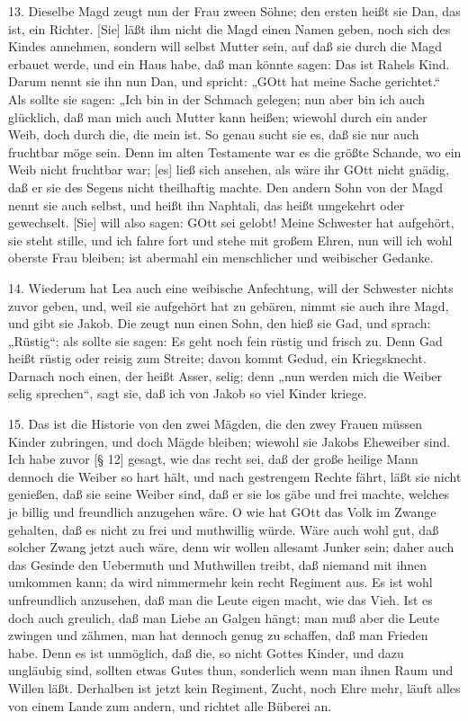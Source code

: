 13. Dieselbe Magd zeugt nun der Frau zween Söhne; den ersten heißt sie Dan, das ist, ein Richter. [Sie] läßt ihm nicht die Magd einen Namen geben, noch sich des Kindes annehmen, sondern will selbst Mutter sein, auf daß sie durch die Magd erbauet werde, und ein Haus habe, daß man könnte sagen: Das ist Rahels Kind. Darum nennt sie ihn nun Dan, und spricht: „GOtt hat meine Sache gerichtet.“ Als sollte sie sagen: „Ich bin in der Schmach gelegen; nun aber bin ich auch glücklich, daß man mich auch Mutter kann heißen; wiewohl durch ein ander Weib, doch durch die, die mein ist. So genau sucht sie es, daß sie nur auch fruchtbar möge sein. Denn im alten Testamente war es die größte Schande, wo ein Weib nicht fruchtbar war; [es] ließ sich ansehen, als wäre ihr GOtt nicht gnädig, daß er sie des Segens nicht theilhaftig machte. Den andern Sohn von der Magd nennt sie auch selbst, und heißt ihn Naphtali, das heißt umgekehrt oder gewechselt. [Sie] will also sagen: GOtt sei gelobt! Meine Schwester hat aufgehört, sie steht stille, und ich fahre fort und stehe mit großem Ehren, nun will ich wohl oberste Frau bleiben; ist abermahl ein menschlicher und weibischer Gedanke.

14. Wiederum hat Lea auch eine weibische Anfechtung, will der Schwester nichts zuvor geben, und, weil sie aufgehört hat zu gebären, nimmt sie auch ihre Magd, und gibt sie Jakob. Die zeugt nun einen Sohn, den hieß sie Gad, und sprach: „Rüstig“; als sollte sie sagen: Es geht noch fein rüstig und frisch zu. Denn Gad heißt rüstig oder reisig zum Streite; davon kommt Gedud, ein Kriegsknecht. Darnach noch einen, der heißt Asser, selig; denn „nun werden mich die Weiber selig sprechen“, sagt sie, daß ich von Jakob so viel Kinder kriege.

15. Das ist die Historie von den zwei Mägden, die den zwey Frauen müssen Kinder zubringen, und doch Mägde bleiben; wiewohl sie Jakobs Eheweiber sind. Ich habe zuvor [§ 12] gesagt, wie das recht sei, daß der große heilige Mann dennoch die Weiber so hart hält, und nach gestrengem Rechte fährt, läßt sie nicht genießen, daß sie seine Weiber sind, daß er sie los gäbe und frei machte, welches je billig und freundlich anzugehen wäre. O wie hat GOtt das Volk im Zwange gehalten, daß es nicht zu frei und muthwillig würde. Wäre auch wohl gut, daß solcher Zwang jetzt auch wäre, denn wir wollen allesamt Junker sein; daher auch das Gesinde den Uebermuth und Muthwillen treibt, daß niemand mit ihnen umkommen kann; da wird nimmermehr kein recht Regiment aus. Es ist wohl unfreundlich anzusehen, daß man die Leute eigen macht, wie das Vieh. Ist es doch auch
greulich, daß man Liebe an Galgen hängt; man muß aber die Leute zwingen und zähmen, man hat dennoch genug zu schaffen, daß man Frieden habe. Denn es ist unmöglich, daß die, so nicht Gottes Kinder, und dazu ungläubig sind, sollten etwas Gutes thun, sonderlich wenn man ihnen Raum und Willen läßt. Derhalben ist jetzt kein Regiment, Zucht, noch Ehre mehr, läuft alles von einem Lande zum andern, und richtet alle Büberei an.


